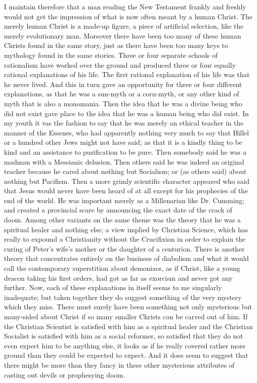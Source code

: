 I maintain therefore that a man reading the New Testament frankly and freshly would not get the impression of what is now often meant by a human Christ. The merely human Christ is a made-up figure, a piece of artificial selection, like the merely evolutionary man. Moreover there have been too many of these human Christs found in the same story, just as there have been too many keys to mythology found in the same stories. Three or four separate schools of rationalism have worked over the ground and produced three or four equally rational explanations of his life. The first rational explanation of his life was that he never lived. And this in turn gave an opportunity for three or four different explanations, as that he was a sun-myth or a corn-myth, or any other kind of myth that is also a monomania. Then the idea that he was a divine being who did not exist gave place to the idea that he was a human being who did exist. In my youth it vas the fashion to say that he was merely an ethical teacher in the manner of the Essenes, who had apparently nothing very much to say that Hillel or a hundred other Jews might not have said; as that it is a kindly thing to be kind and an assistance to purification to be pure. Then somebody said he was a madman with a Messianic delusion. Then others said he was indeed an original teacher because he cared about nothing but Socialism; or (as others said) about nothing but Pacifism. Then a more grimly scientific character appeared who said that Jesus would never have been heard of at all except for his prophecies of the end of the world. He was important merely as a Millenarian like Dr. Cumming; and created a provincial scare by announcing the exact date of the crack of doom. Among other variants on the same theme was the theory that he was a spiritual healer and nothing else; a view implied by Christian Science, which has really to expound a Christianity without the Crucifixion in order to explain the curing of Peter's wife's mother or the daughter of a centurion. There is another theory that concentrates entirely on the business of diabolism and what it would call the contemporary superstition about demoniacs, as if Christ, like a young deacon taking his first orders, had got as far as exorcism and never got any further. Now, each of these explanations in itself seems to me singularly inadequate; but taken together they do suggest something of the very mystery which they miss. There must surely have been something not only mysterious but many-sided about Christ if so many smaller Christs can be carved out of him. If the Christian Scientist is satisfied with him as a spiritual healer and the Christian Socialist is satisfied with him as a social reformer, so satisfied that they do not even expect him to be anything else, it looks as if he really covered rather more ground than they could be expected to expect. And it does seem to suggest that there might be more than they fancy in these other mysterious attributes of casting out devils or prophesying doom.

